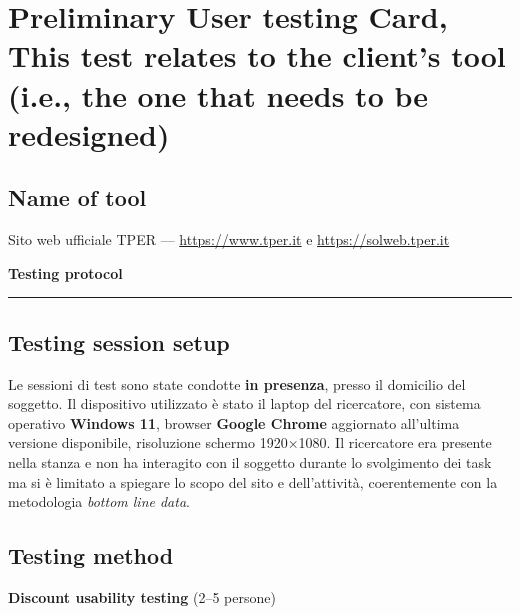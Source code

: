 \documentclass[11pt,a4paper]{article}
\begin{document}
\newpage

\section{Preliminary User testing Card, 
This test relates to the client's tool
(i.e., the one that needs to be redesigned)}

\vspace{0.2cm}

\subsection*{Name of tool}
\begin{tcolorbox}[colback=backgroundColor,colframe=borderColor,arc=2mm]
Sito web ufficiale TPER --- \url{https://www.tper.it} e \url{https://solweb.tper.it}
\end{tcolorbox}

\vspace{0.2cm}

\begin{center}
  {\color{primaryColor}\large\bfseries Testing protocol}
  \vspace{0.1cm}
  \color{borderColor}\hrule
\end{center}

\vspace{0.2cm}

\subsection*{Testing session setup}
\begin{tcolorbox}[colback=backgroundColor,colframe=borderColor,arc=2mm]
Le sessioni di test sono state condotte \textbf{in presenza},
presso il domicilio del soggetto. Il dispositivo utilizzato è
stato il laptop del ricercatore, con sistema operativo
\textbf{Windows 11}, browser \textbf{Google Chrome} aggiornato
all'ultima versione disponibile, risoluzione schermo 1920×1080.
Il ricercatore era presente nella stanza e non ha interagito
con il soggetto durante lo svolgimento dei task ma si è limitato a spiegare lo scopo del sito e dell'attività, coerentemente
con la metodologia \textit{bottom line data}.
\end{tcolorbox}

\vspace{0.2cm}

\subsection*{Testing method}
\textbf{Discount usability testing} (2--5 persone)
\end{document}
